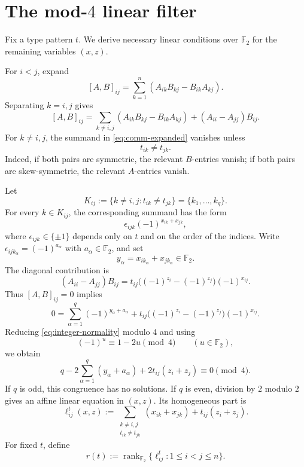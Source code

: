 \documentclass[11pt]{amsart}
\theoremstyle{remark}
\numberwithin{equation}{section}
\newcommand{\F}{\mathbb F}
\newcommand{\rank}{\operatorname{rank}}
\begin{document}
\section{The mod-$4$ linear filter}

Fix a type pattern $t$.  We derive necessary linear conditions over $\F_2$ for the remaining variables $(x,z)$.

For $i<j$, expand
\[
        [A,B]_{ij}=\sum_{k=1}^n(A_{ik}B_{kj}-B_{ik}A_{kj}).
\]
Separating $k=i,j$ gives
\begin{equation}\label{eq:comm-expanded}
        [A,B]_{ij}=\sum_{k\ne i,j}(A_{ik}B_{kj}-B_{ik}A_{kj})+(A_{ii}-A_{jj})B_{ij}.
\end{equation}
For $k\ne i,j$, the summand in \eqref{eq:comm-expanded} vanishes unless
\[
        t_{ik}\ne t_{jk}.
\]
Indeed, if both pairs are symmetric, the relevant $B$-entries vanish; if both pairs are skew-symmetric, the relevant $A$-entries vanish.

Let
\[
        K_{ij}:=\{k\ne i,j:t_{ik}\ne t_{jk}\}=\{k_1,\ldots,k_q\}.
\]
For every $k\in K_{ij}$, the corresponding summand has the form
\[
        \epsilon_{ijk}(-1)^{x_{ik}+x_{jk}},
\]
where $\epsilon_{ijk}\in\{\pm1\}$ depends only on $t$ and on the order of the indices.  Write $\epsilon_{ijk_\alpha}=(-1)^{a_\alpha}$ with $a_\alpha\in\F_2$, and set
\[
        y_\alpha=x_{ik_\alpha}+x_{jk_\alpha}\in\F_2.
\]
The diagonal contribution is
\[
        (A_{ii}-A_{jj})B_{ij}=t_{ij}\bigl((-1)^{z_i}-(-1)^{z_j}\bigr)(-1)^{x_{ij}}.
\]
Thus $[A,B]_{ij}=0$ implies
\begin{equation}\label{eq:integer-normality}
        0=\sum_{\alpha=1}^q(-1)^{y_\alpha+a_\alpha}
        +t_{ij}\bigl((-1)^{z_i}-(-1)^{z_j}\bigr)(-1)^{x_{ij}}.
\end{equation}
Reducing \eqref{eq:integer-normality} modulo $4$ and using
\[
        (-1)^u\equiv 1-2u\pmod 4\qquad (u\in\F_2),
\]
we obtain
\[
        q-2\sum_{\alpha=1}^q(y_\alpha+a_\alpha)+2t_{ij}(z_i+z_j)\equiv0\pmod4.
\]
If $q$ is odd, this congruence has no solutions.  If $q$ is even, division by $2$ modulo $2$ gives an affine linear equation in $(x,z)$.  Its homogeneous part is
\begin{equation}\label{eq:linear-form}
        \ell^t_{ij}(x,z)
        :=\sum_{\substack{k\ne i,j\\ t_{ik}\ne t_{jk}}}(x_{ik}+x_{jk})+t_{ij}(z_i+z_j).
\end{equation}
For fixed $t$, define
\[
        r(t):=\rank_{\F_2}\{\ell^t_{ij}:1\leq i<j\leq n\}.
\]
\end{document}
